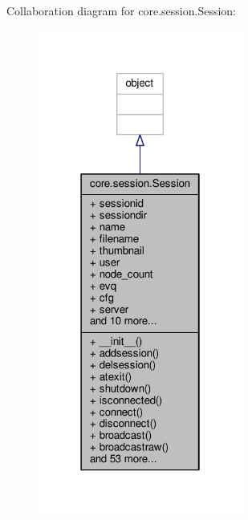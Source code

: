 Collaboration diagram for core.\+session.\+Session\+:
\nopagebreak
\begin{figure}[H]
\begin{center}
\leavevmode
\includegraphics[width=190pt]{classcore_1_1session_1_1_session__coll__graph}
\end{center}
\end{figure}
